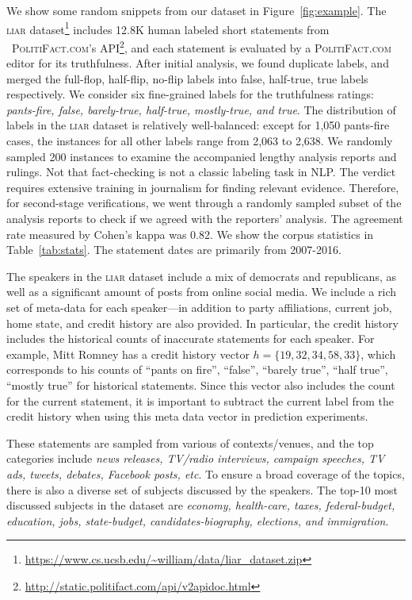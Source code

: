 \documentclass[11pt,a4paper]{article}
\begin{document}
{\sloppypar
We show some random snippets from our dataset in Figure~\ref{fig:example}. The \textsc{liar} dataset\footnote{\url{https://www.cs.ucsb.edu/~william/data/liar\_dataset.zip}} includes 12.8K human labeled short statements from
~\textsc{PolitiFact.com}'s API\footnote{\url{http://static.politifact.com/api/v2apidoc.html}}, and each statement is evaluated by a \textsc{PolitiFact.com} editor for its truthfulness. After initial analysis, we found duplicate labels, and merged the full-flop, half-flip, no-flip labels into false, half-true, true labels respectively. We consider six fine-grained labels for the truthfulness ratings: \emph{pants-fire, false, barely-true, half-true, mostly-true, and true}. 
The distribution of labels in the \textsc{liar} dataset is relatively well-balanced: except for 1,050 pants-fire cases, the instances for all other labels range from 2,063 to 2,638. We randomly sampled 200 instances to examine the accompanied lengthy analysis reports and rulings. 
Not that fact-checking is not a classic labeling task in NLP. The verdict requires extensive training in journalism for finding relevant evidence. Therefore, for second-stage verifications, we went through a randomly sampled subset of the analysis reports to check if we agreed with the reporters' analysis. The agreement rate measured by Cohen’s kappa was 0.82. We show the corpus statistics in Table~\ref{tab:stats}. The statement dates are primarily from 2007-2016.} 

The speakers in the \textsc{liar} dataset include a mix of democrats and republicans,
as well as a significant amount of posts from online social media. We include a rich set of meta-data for each speaker---in addition to party affiliations, current job, home state, and credit history are also provided. In particular, the credit history includes the historical counts of inaccurate statements for each speaker. For example, Mitt Romney has a credit history vector $h=\{19,32,34,58,33\}$,
which corresponds to his counts of ``pants on fire'', ``false'', ``barely true'',  ``half true'', ``mostly true'' for historical statements. Since this vector also includes the count for the current statement, it is important to subtract the current label from the credit history when using this meta data vector in prediction experiments. 

These statements are sampled from various of contexts/venues, and the top categories include \emph{news releases, TV/radio interviews, campaign speeches, TV ads, tweets, debates, Facebook posts, etc}. To ensure a broad coverage of the topics, there is also a diverse set of subjects discussed by the speakers. The top-10 most discussed subjects in the dataset are \emph{economy, health-care, taxes, federal-budget, education, jobs, state-budget, candidates-biography, elections, and immigration}.
\end{document}
